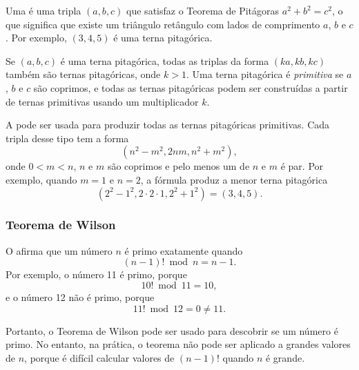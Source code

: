 Uma  é uma tripla $(a,b,c)$ que satisfaz o Teorema de Pitágoras $a^2+b^2=c^2$, o que significa que existe um triângulo retângulo com lados de comprimento $a$, $b$ e $c$. Por exemplo, $(3,4,5)$ é uma terna pitagórica.

Se $(a,b,c)$ é uma terna pitagórica, todas as triplas da forma $(ka,kb,kc)$ também são ternas pitagóricas, onde $k>1$. Uma terna pitagórica é \emph{primitiva} se $a$, $b$ e $c$ são coprimos, e todas as ternas pitagóricas podem ser construídas a partir de ternas primitivas usando um multiplicador $k$.

A  pode ser usada para produzir todas as ternas pitagóricas primitivas. Cada tripla desse tipo tem a forma
\[(n^2-m^2,2nm,n^2+m^2),\]
onde $0<m<n$, $n$ e $m$ são coprimos e pelo menos um de $n$ e $m$ é par. Por exemplo, quando $m=1$ e $n=2$, a fórmula produz a menor terna pitagórica
\[(2^2-1^2,2\cdot2\cdot1,2^2+1^2)=(3,4,5).\]

\subsubsection{Teorema de Wilson}


O 
afirma que um número $n$ é primo exatamente quando
\[(n-1)! \bmod n = n-1.\]
Por exemplo, o número 11 é primo, porque
\[10! \bmod 11 = 10,\]
e o número 12 não é primo, porque
\[11! \bmod 12 = 0 \neq 11.\]

Portanto, o Teorema de Wilson pode ser usado para descobrir se um número é primo. No entanto, na prática, o teorema não pode ser aplicado a grandes valores de $n$, porque é difícil calcular valores de $(n-1)!$ quando $n$ é grande.
